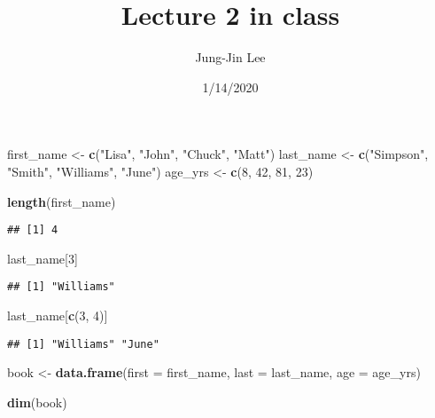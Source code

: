 \documentclass[]{article}
\title{Lecture 2 in class}
\author{Jung-Jin Lee}
\date{1/14/2020}
\newenvironment{Shaded}{\begin{snugshade}}{\end{snugshade}}
\newcommand{\DataTypeTok}[1]{\textcolor[rgb]{0.13,0.29,0.53}{#1}}
\newcommand{\DecValTok}[1]{\textcolor[rgb]{0.00,0.00,0.81}{#1}}
\newcommand{\KeywordTok}[1]{\textcolor[rgb]{0.13,0.29,0.53}{\textbf{#1}}}
\newcommand{\NormalTok}[1]{#1}
\newcommand{\StringTok}[1]{\textcolor[rgb]{0.31,0.60,0.02}{#1}}
\begin{document}
\maketitle

\begin{Shaded}
\begin{Highlighting}[]
\NormalTok{first_name <-}\StringTok{ }\KeywordTok{c}\NormalTok{(}\StringTok{"Lisa"}\NormalTok{, }\StringTok{"John"}\NormalTok{, }\StringTok{"Chuck"}\NormalTok{, }\StringTok{"Matt"}\NormalTok{)}
\NormalTok{last_name <-}\StringTok{ }\KeywordTok{c}\NormalTok{(}\StringTok{"Simpson"}\NormalTok{, }\StringTok{"Smith"}\NormalTok{, }\StringTok{"Williams"}\NormalTok{, }\StringTok{"June"}\NormalTok{)}
\NormalTok{age_yrs <-}\StringTok{ }\KeywordTok{c}\NormalTok{(}\DecValTok{8}\NormalTok{, }\DecValTok{42}\NormalTok{, }\DecValTok{81}\NormalTok{, }\DecValTok{23}\NormalTok{)}

\KeywordTok{length}\NormalTok{(first_name)}
\end{Highlighting}
\end{Shaded}

\begin{verbatim}
## [1] 4
\end{verbatim}

\begin{Shaded}
\begin{Highlighting}[]
\NormalTok{last_name[}\DecValTok{3}\NormalTok{]}
\end{Highlighting}
\end{Shaded}

\begin{verbatim}
## [1] "Williams"
\end{verbatim}

\begin{Shaded}
\begin{Highlighting}[]
\NormalTok{last_name[}\KeywordTok{c}\NormalTok{(}\DecValTok{3}\NormalTok{, }\DecValTok{4}\NormalTok{)]}
\end{Highlighting}
\end{Shaded}

\begin{verbatim}
## [1] "Williams" "June"
\end{verbatim}

\begin{Shaded}
\begin{Highlighting}[]
\NormalTok{book <-}\StringTok{ }\KeywordTok{data.frame}\NormalTok{(}\DataTypeTok{first =}\NormalTok{ first_name, }
                   \DataTypeTok{last =}\NormalTok{ last_name,}
                   \DataTypeTok{age =}\NormalTok{ age_yrs)}

\KeywordTok{dim}\NormalTok{(book)}
\end{Highlighting}
\end{Shaded}
\end{document}
